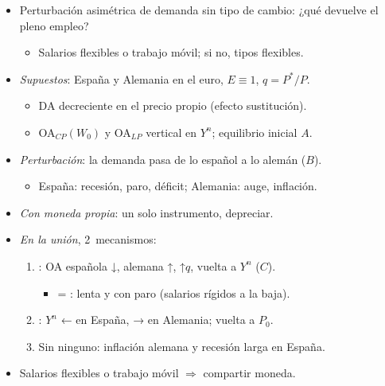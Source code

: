 \documentclass{article}
\begin{document}
\begin{columnas}
\begin{itemize}
\item Perturbación asimétrica de demanda sin tipo de cambio: ¿qué devuelve el pleno empleo?
  \begin{itemize}
  \item Salarios flexibles o trabajo móvil; si no, tipos flexibles.
  \end{itemize}
\end{itemize}
\begin{itemize}
\item \emph{Supuestos}: España y Alemania en el euro, $E\equiv1$, $q=P^*/P$.
  \begin{itemize}
  \item DA decreciente en el precio propio (efecto sustitución).
  \item OA$_{CP}(W_0)$ y OA$_{LP}$ vertical en $Y^n$; equilibrio inicial $A$.
  \end{itemize}
\item \emph{Perturbación}: la demanda pasa de lo español a lo alemán ($B$).
  \begin{itemize}
  \item España: recesión, paro, déficit; Alemania: auge, inflación.
  \end{itemize}
\item \emph{Con moneda propia}: un solo instrumento, depreciar.
\item \emph{En la unión}, 2~mecanismos:
  \begin{enumerate}
  \item {}: OA española ↓, alemana ↑, ↑$q$, vuelta a $Y^n$ ($C$).
    \begin{itemize}
    \item = : lenta y con paro (salarios rígidos a la baja).
    \end{itemize}
  \item {}: $Y^n$ ← en España, → en Alemania; vuelta a $P_0$.
  \item Sin ninguno: inflación alemana y recesión larga en España.
  \end{enumerate}
\end{itemize}
\begin{itemize}
\item Salarios flexibles o trabajo móvil $\Rightarrow$ compartir moneda.

\end{itemize}
\end{columnas}
\end{document}
